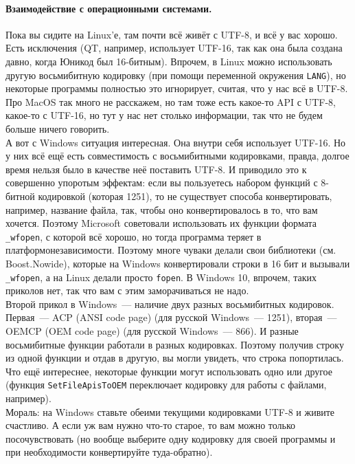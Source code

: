 \documentclass{article}
\begin{document}
    \paragraph{Взаимодействие с операционными системами.}
    Пока вы сидите на Linux'е, там почти всё живёт с UTF-8, и всё у вас хорошо. Есть исключения (QT, например, использует UTF-16, так как она была создана давно, когда Юникод был 16-битным). Впрочем, в Linux можно использовать другую восьмибитную кодировку (при помощи переменной окружения \texttt{LANG}), но некоторые программы полностью это игнорирует, считая, что у нас всё в UTF-8.\\
    Про MacOS так много не расскажем, но там тоже есть какое-то API с UTF-8, какое-то с UTF-16, но тут у нас нет столько информации, так что не будем больше ничего говорить.\\
    А вот с Windows ситуация интересная. Она внутри себя использует UTF-16. Но у них всё ещё есть совместимость с восьмибитными кодировками, правда, долгое время нельзя было в качестве неё поставить UTF-8. И приводило это к совершенно упоротым эффектам: если вы пользуетесь набором функций с 8-битной кодировкой (которая 1251), то не существует способа конвертировать, например, название файла, так, чтобы оно конвертировалось в то, что вам хочется. Поэтому Microsoft советовали использовать их функции формата \texttt{_wfopen}, с которой всё хорошо, но тогда программа теряет в платформонезависимости. Поэтому многе чуваки делали свои библиотеки (см. Boost.Nowide), которые на Windows конвертировали строки в 16 бит и вызывали \texttt{_wfopen}, а на Linux делали просто \texttt{fopen}. В Windows 10, впрочем, таких приколов нет, так что вам с этим заморачиваться не надо.\\
    Второй прикол в Windows~--- наличие двух разных восьмибитных кодировок. Первая~--- ACP (ANSI code page) (для русской Windows~--- 1251),  вторая~--- OEMCP (OEM code page) (для русской Windows~--- 866). И разные восьмибитные функции работали в разных кодировках. Поэтому получив строку из одной функции и отдав в другую, вы могли увидеть, что строка попортилась. Что ещё интереснее, некоторые функции могут использовать одно или другое (функция \texttt{SetFileApisToOEM} переключает кодировку для работы с файлами, например).\\
    Мораль: на Windows ставьте обеими текущими кодировками UTF-8 и живите счастливо. А если уж вам нужно что-то старое, то вам можно только посочувствовать (но вообще выберите одну кодировку для своей программы и при необходимости конвертируйте туда-обратно).
\end{document}
